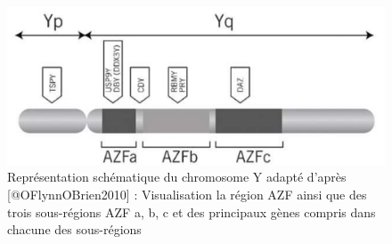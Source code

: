 \documentclass[12pt,twoside]{reedthesis}
\theoremstyle{definition}
\theoremstyle{definition}
\theoremstyle{remark}
\begin{document}
  \newpage
  
  \begin{figure}
  
  {\centering \includegraphics[scale=.45]{figure/chromozomeY} 
  
  }
  
  \caption[Représentation schématique du chromosome Y adapté]{Représentation schématique du chromosome Y adapté d'après [@OFlynnOBrien2010] : Visualisation la région AZF ainsi que des trois sous-régions AZF a, b, c et des principaux gènes compris dans chacune des sous-régions}\label{fig:chry}
  \end{figure}
  
\end{document}

